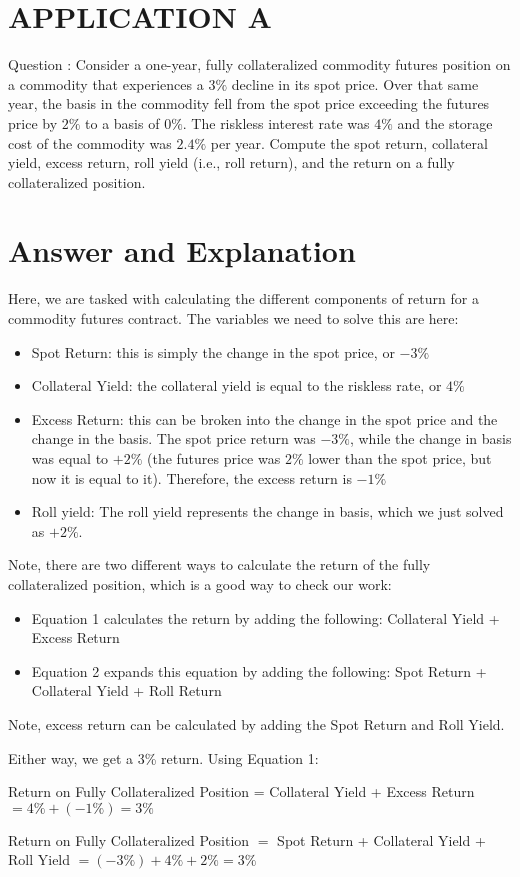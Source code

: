 \documentclass[11pt]{article}
\begin{document}
\section*{APPLICATION A}
Question : Consider a one-year, fully collateralized commodity futures position on a commodity that experiences a $3 \%$ decline in its spot price. Over that same year, the basis in the commodity fell from the spot price exceeding the futures price by $2 \%$ to a basis of $0 \%$. The riskless interest rate was $4 \%$ and the storage cost of the commodity was $2.4 \%$ per year. Compute the spot return, collateral yield, excess return, roll yield (i.e., roll return), and the return on a fully collateralized position.

\section*{Answer and Explanation}
Here, we are tasked with calculating the different components of return for a commodity futures contract. The variables we need to solve this are here:

\begin{itemize}
  \item Spot Return: this is simply the change in the spot price, or $-3 \%$
  \item Collateral Yield: the collateral yield is equal to the riskless rate, or $4 \%$
  \item Excess Return: this can be broken into the change in the spot price and the change in the basis. The spot price return was $-3 \%$, while the change in basis was equal to $+2 \%$ (the futures price was $2 \%$ lower than the spot price, but now it is equal to it). Therefore, the excess return is $-1 \%$
  \item Roll yield: The roll yield represents the change in basis, which we just solved as $+2 \%$.
\end{itemize}

Note, there are two different ways to calculate the return of the fully collateralized position, which is a good way to check our work:

\begin{itemize}
  \item Equation 1 calculates the return by adding the following: Collateral Yield + Excess Return
  \item Equation 2 expands this equation by adding the following: Spot Return + Collateral Yield + Roll Return
\end{itemize}

Note, excess return can be calculated by adding the Spot Return and Roll Yield.

Either way, we get a 3\% return. Using Equation 1:

Return on Fully Collateralized Position = Collateral Yield + Excess Return $=4 \%+(-1 \%)=3 \%$

Return on Fully Collateralized Position $=$ Spot Return + Collateral Yield + Roll Yield $=(-3 \%)+4 \%+2 \%=3 \%$
\end{document}
